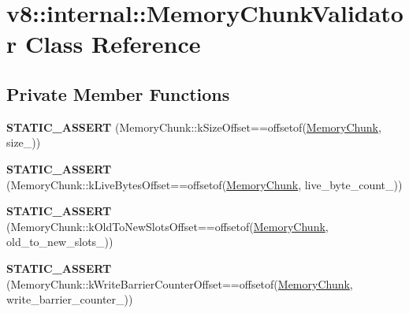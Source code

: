 \hypertarget{classv8_1_1internal_1_1_memory_chunk_validator}{}\section{v8\+:\+:internal\+:\+:Memory\+Chunk\+Validator Class Reference}
\label{classv8_1_1internal_1_1_memory_chunk_validator}
\subsection*{Private Member Functions}
\begin{DoxyCompactItemize}
\item 
{\bfseries S\+T\+A\+T\+I\+C\+\_\+\+A\+S\+S\+E\+RT} (Memory\+Chunk\+::k\+Size\+Offset==offsetof(\hyperlink{classv8_1_1internal_1_1_memory_chunk}{Memory\+Chunk}, size\+\_\+))\hypertarget{classv8_1_1internal_1_1_memory_chunk_validator_a75abda460db114c434fe1120828a1c69}{}\label{classv8_1_1internal_1_1_memory_chunk_validator_a75abda460db114c434fe1120828a1c69}

\item 
{\bfseries S\+T\+A\+T\+I\+C\+\_\+\+A\+S\+S\+E\+RT} (Memory\+Chunk\+::k\+Live\+Bytes\+Offset==offsetof(\hyperlink{classv8_1_1internal_1_1_memory_chunk}{Memory\+Chunk}, live\+\_\+byte\+\_\+count\+\_\+))\hypertarget{classv8_1_1internal_1_1_memory_chunk_validator_a07913cea8633bbb026da659007de3b04}{}\label{classv8_1_1internal_1_1_memory_chunk_validator_a07913cea8633bbb026da659007de3b04}

\item 
{\bfseries S\+T\+A\+T\+I\+C\+\_\+\+A\+S\+S\+E\+RT} (Memory\+Chunk\+::k\+Old\+To\+New\+Slots\+Offset==offsetof(\hyperlink{classv8_1_1internal_1_1_memory_chunk}{Memory\+Chunk}, old\+\_\+to\+\_\+new\+\_\+slots\+\_\+))\hypertarget{classv8_1_1internal_1_1_memory_chunk_validator_adfd1a094429884d2b75b92ba1862b011}{}\label{classv8_1_1internal_1_1_memory_chunk_validator_adfd1a094429884d2b75b92ba1862b011}

\item 
{\bfseries S\+T\+A\+T\+I\+C\+\_\+\+A\+S\+S\+E\+RT} (Memory\+Chunk\+::k\+Write\+Barrier\+Counter\+Offset==offsetof(\hyperlink{classv8_1_1internal_1_1_memory_chunk}{Memory\+Chunk}, write\+\_\+barrier\+\_\+counter\+\_\+))\hypertarget{classv8_1_1internal_1_1_memory_chunk_validator_a62a18e8ba4eba874b9482e16383dbc58}{}\label{classv8_1_1internal_1_1_memory_chunk_validator_a62a18e8ba4eba874b9482e16383dbc58}


\end{DoxyCompactItemize}
